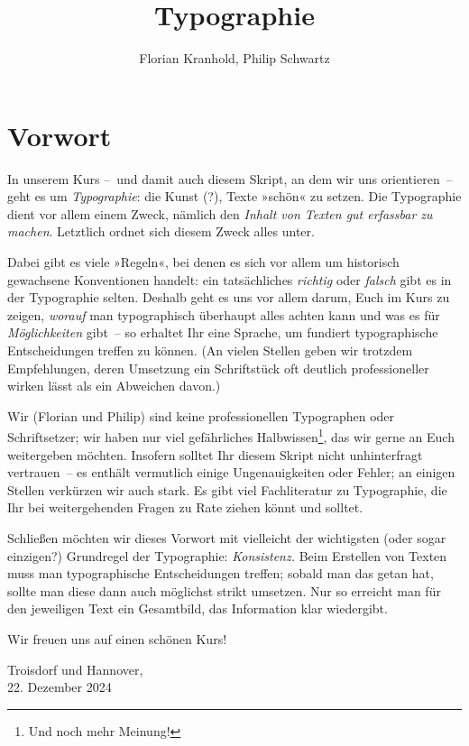 \documentclass[british,ngerman]{scrbook}
\author{Florian Kranhold, Philip Schwartz}
\title {Typographie}
\begin{document}
\frontmatter


\chapter*{Vorwort}
In unserem Kurs --~und damit auch diesem Skript, an dem wir uns
orientieren~-- geht es um \emph{Typographie}: die Kunst (?), Texte
»schön« zu setzen.  Die Typographie dient vor allem einem Zweck,
nämlich den \emph{Inhalt von Texten gut erfassbar zu machen}.
Letztlich ordnet sich diesem Zweck alles unter.

Dabei gibt es viele »Regeln«, bei denen es sich vor allem um
historisch gewachsene Konventionen handelt: ein tatsächliches
\emph{richtig} oder \emph{falsch} gibt es in der Typographie selten.
Deshalb geht es uns vor allem darum, Euch im Kurs zu zeigen,
\emph{worauf} man typographisch überhaupt alles achten kann und was es
für \emph{Möglichkeiten} gibt~-- so erhaltet Ihr eine Sprache, um
fundiert typographische Entscheidungen treffen zu können.  (An vielen
Stellen geben wir trotzdem Empfehlungen, deren Umsetzung ein
Schriftstück oft deutlich professioneller wirken lässt als ein
Abweichen davon.)

Wir (Florian und Philip) sind keine professionellen Typographen oder
Schriftsetzer; wir haben nur viel gefährliches Halbwissen\footnote{Und
  noch mehr Meinung!}, das wir gerne an Euch weitergeben möchten.
Insofern solltet Ihr diesem Skript nicht unhinterfragt vertrauen~-- es
enthält vermutlich einige Ungenauigkeiten oder Fehler; an einigen
Stellen verkürzen wir auch stark.  Es gibt viel Fachliteratur zu
Typographie, die Ihr bei weitergehenden Fragen zu Rate ziehen könnt
und solltet.

Schließen möchten wir dieses Vorwort mit vielleicht der wichtigsten
(oder sogar einzigen?) Grundregel der Typographie: \emph{Konsistenz.}
Beim Erstellen von Texten muss man typographische Entscheidungen
treffen; sobald man das getan hat, sollte man diese dann auch
möglichst strikt umsetzen.  Nur so erreicht man für den jeweiligen
Text ein Gesamtbild, das Information klar wiedergibt.

Wir freuen uns auf einen schönen Kurs!

\begin{flushright}
  Troisdorf und Hannover,\\22. Dezember 2024
\end{flushright}

\mainmatter




\end{document}
